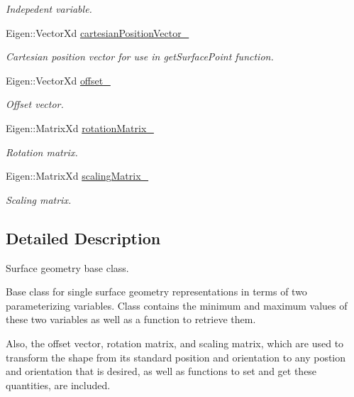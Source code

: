 \begin{DoxyCompactItemize}
\begin{DoxyCompactList}\small\item\em Indepedent variable. \end{DoxyCompactList}\item 
Eigen\+::\+Vector\+Xd \hyperlink{classtudat_1_1geometric__shapes_1_1SingleSurfaceGeometry_aa23bba50be6214d1621308761d8e3bb1}{cartesian\+Position\+Vector\+\_\+}
\begin{DoxyCompactList}\small\item\em Cartesian position vector for use in get\+Surface\+Point function. \end{DoxyCompactList}\item 
Eigen\+::\+Vector\+Xd \hyperlink{classtudat_1_1geometric__shapes_1_1SingleSurfaceGeometry_a221abc0887c99ceb7368bf0bcfbcee98}{offset\+\_\+}
\begin{DoxyCompactList}\small\item\em Offset vector. \end{DoxyCompactList}\item 
Eigen\+::\+Matrix\+Xd \hyperlink{classtudat_1_1geometric__shapes_1_1SingleSurfaceGeometry_a61a1d7b8952fb3d283ad409a2a5c4bd1}{rotation\+Matrix\+\_\+}
\begin{DoxyCompactList}\small\item\em Rotation matrix. \end{DoxyCompactList}\item 
Eigen\+::\+Matrix\+Xd \hyperlink{classtudat_1_1geometric__shapes_1_1SingleSurfaceGeometry_ade223ab8cae98c7c90ad339e47e2fae8}{scaling\+Matrix\+\_\+}
\begin{DoxyCompactList}\small\item\em Scaling matrix. \end{DoxyCompactList}\end{DoxyCompactItemize}


\subsection{Detailed Description}
Surface geometry base class. 

Base class for single surface geometry representations in terms of two parameterizing variables. Class contains the minimum and maximum values of these two variables as well as a function to retrieve them.

Also, the offset vector, rotation matrix, and scaling matrix, which are used to transform the shape from its \textquotesingle{}standard\textquotesingle{} position and orientation to any postion and orientation that is desired, as well as functions to set and get these quantities, are included. 

